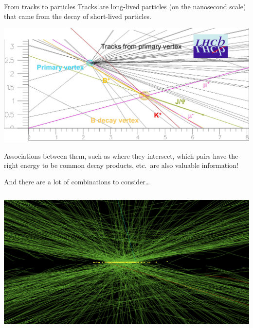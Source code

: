 \documentclass[aspectratio=169]{beamer}
\begin{document}
\begin{frame}{From tracks to particles}
\vspace{0.25 cm}
Tracks are long-lived particles (on the nanosecond scale) that came from the decay of short-lived particles.

\vspace{-0.5 cm}
\begin{center}
\includegraphics[width=0.9\linewidth]{lhcb.png}
\end{center}

\vspace{-0.25 cm}
Associations between them, such as where they intersect, which pairs have the right energy to be common decay products, etc.\ are also valuable information!
\end{frame}

\begin{frame}{And there are a lot of combinations to consider\ldots}
\vspace{0.15 cm}
\begin{columns}
\includegraphics[width=\linewidth]{pileup.png}
\end{columns}
\end{frame}




\end{document}
